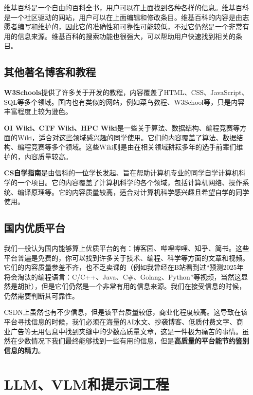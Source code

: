 维基百科是一个自由的百科全书，用户可以在上面找到各种各样的信息。维基百科是一个社区驱动的网站，用户可以在上面编辑和修改条目。维基百科的内容是由志愿者编写和维护的，因此它的准确性和可靠性可能较低，不过它仍然是一个非常有用的信息来源。维基百科的搜索功能也很强大，可以帮助用户快速找到相关的条目。

\subsection{其他著名博客和教程}

\textbf{W3Schools}提供了许多关于开发的教程，内容覆盖了HTML、CSS、JavaScript、SQL等多个领域。国内也有类似的网站，例如菜鸟教程、W3School等，只是内容丰富程度上较为逊色。

\textbf{OI Wiki、CTF Wiki、HPC Wiki}是一些关于算法、数据结构、编程竞赛等方面的Wiki，适合对这些领域感兴趣的同学使用。它们的内容覆盖了算法、数据结构、编程竞赛等多个领域。这些Wiki则是由在相关领域耕耘多年的选手前辈们维护的，内容质量较高。

\textbf{CS自学指南}是由信科的一位学长发起、旨在帮助计算机专业的同学自学计算机科学的一个项目。它的内容覆盖了计算机科学的各个领域，包括计算机网络、操作系统、编译原理等。它的内容质量较高，适合对计算机科学感兴趣且希望自学的同学使用。

\subsection{国内优质平台}

我们一般认为国内能够算上优质平台的有：博客园、哔哩哔哩、知乎、简书。这些平台普遍是免费的，你可以找到许多关于技术、编程、科学等方面的文章和视频。它们的内容质量参差不齐，也不乏卖课的（例如我曾经在B站看到过“预测2025年将会淘汰的编程语言：C/C++、Java、C\#、Golang、Python”等视频，当然这显然是胡扯），但是它们仍然是一个非常有用的信息来源。我们在接受信息的时候，仍然需要判断其可靠性。

\begin{note}
  CSDN上虽然也有不少信息，但是该平台质量较低，商业化程度较高。这导致在该平台寻找信息的时候，我们必须在海量的AI水文、抄袭博客、低质付费文字、商业广告等无用信息中找到夹缝中的少数高质量文章，这是一件极为痛苦的事情。虽然在少数情况下我们最终能够找到一些有用的信息，但是\textbf{高质量的平台能节约鉴别信息的精力}。
\end{note}

\section{LLM、VLM和提示词工程}

